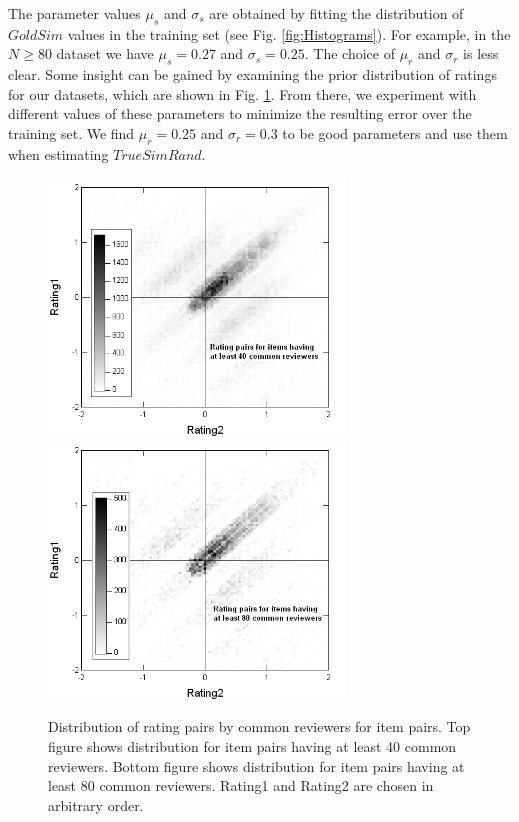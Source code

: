 \documentclass[11pt]{article}
\begin{document}
The parameter values $\mu_s$ and $\sigma_s$ are obtained by fitting the
distribution of $GoldSim$ values in the training set (see Fig.
\ref{fig:Histograms}). For example, in the $N \geq 80$ dataset we have $\mu_s =
0.27$ and $\sigma_s = 0.25$. The choice of $\mu_r$ and $\sigma_r$ is less clear.
Some insight can be gained by examining the prior distribution of ratings for 
our datasets, which are shown in Fig. \ref{fig:RatingDist}. From there, we
experiment with different values of these parameters to minimize the resulting
error over the training set. We find $\mu_r = 0.25$ and $\sigma_r = 0.3$ to be
good parameters and use them when estimating $TrueSimRand$.

\begin{figure}[!htbp]
    \centering
    \includegraphics[width=0.7\textwidth]{RatingDist_40.png}
    \includegraphics[width=0.7\textwidth]{RatingDist_80.png}
	\caption{Distribution of rating pairs by common reviewers for item pairs.
Top figure shows distribution for item pairs having at least 40 common
reviewers. Bottom figure shows distribution for item pairs having at least 80
common reviewers. Rating1 and Rating2 are chosen in arbitrary order.}
    \label{fig:RatingDist}
\end{figure}
\end{document}
